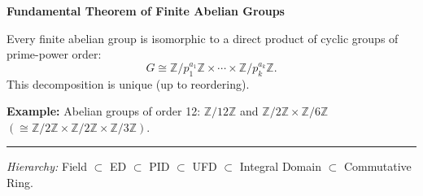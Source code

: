 \documentclass[10pt,twocolumn]{article}
\newcommand{\subsect}[1]{\smallskip\noindent\textbf{#1}\par}
\begin{document}
\subsect{Fundamental Theorem of Finite Abelian Groups}
Every finite abelian group is isomorphic to a direct product of cyclic groups of prime-power order:
\[
G\cong \mathbb{Z}/p_1^{a_1}\mathbb{Z}\times\cdots\times\mathbb{Z}/p_k^{a_k}\mathbb{Z}.
\]
This decomposition is unique (up to reordering).

\textbf{Example:} Abelian groups of order 12:
$\mathbb{Z}/12\mathbb{Z}$ \;and\; $\mathbb{Z}/2\mathbb{Z}\times\mathbb{Z}/6\mathbb{Z}$ $(\cong\mathbb{Z}/2\mathbb{Z}\times\mathbb{Z}/2\mathbb{Z}\times\mathbb{Z}/3\mathbb{Z})$.

\bigskip
\hrule
\smallskip
\begin{center}
\textit{Hierarchy:}\; Field $\subset$ ED $\subset$ PID $\subset$ UFD $\subset$ Integral Domain $\subset$ Commutative Ring.
\end{center}
\end{document}
